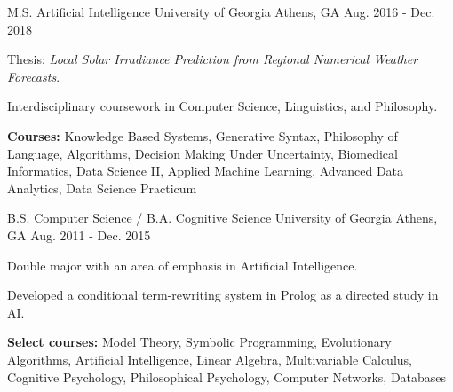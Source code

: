 \begin{cventries}

\cventry
{M.S. Artificial Intelligence}
{University of Georgia}
{Athens, GA}
{Aug. 2016 - Dec. 2018}
{\begin{cvitems}
    \item {Thesis: \textit{Local Solar Irradiance Prediction from Regional Numerical Weather Forecasts}.}
    \item {Interdisciplinary coursework in Computer Science, Linguistics, and Philosophy.}
    \item {\textbf{Courses:} Knowledge Based Systems, Generative Syntax, Philosophy of Language, Algorithms, Decision Making Under Uncertainty, Biomedical Informatics, Data Science II, Applied Machine Learning, Advanced Data Analytics, Data Science Practicum}
\end{cvitems}}

\cventry
{B.S. Computer Science / B.A. Cognitive Science}
{University of Georgia}
{Athens, GA}
{Aug. 2011 - Dec. 2015}
{\begin{cvitems}
    \item {Double major with an area of emphasis in Artificial Intelligence.}
    \item {Developed a conditional term-rewriting system in Prolog as a directed study in AI.}
    \item {\textbf{Select courses:} Model Theory, Symbolic Programming, Evolutionary Algorithms, Artificial Intelligence, Linear Algebra, Multivariable Calculus, Cognitive Psychology, Philosophical Psychology, Computer Networks, Databases}
\end{cvitems}}

\end{cventries}

